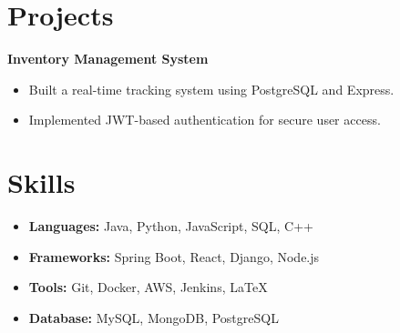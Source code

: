\documentclass[11pt, a4paper]{article}
\begin{document}
\section*{Projects}
\textbf{Inventory Management System}
\begin{itemize}
    \item Built a real-time tracking system using PostgreSQL and Express.
    \item Implemented JWT-based authentication for secure user access.
\end{itemize}

\section*{Skills}
\begin{itemize}
    \item \textbf{Languages:} Java, Python, JavaScript, SQL, C++
    \item \textbf{Frameworks:} Spring Boot, React, Django, Node.js
    \item \textbf{Tools:} Git, Docker, AWS, Jenkins, LaTeX
    \item \textbf{Database:} MySQL, MongoDB, PostgreSQL
\end{itemize}
\end{document}
